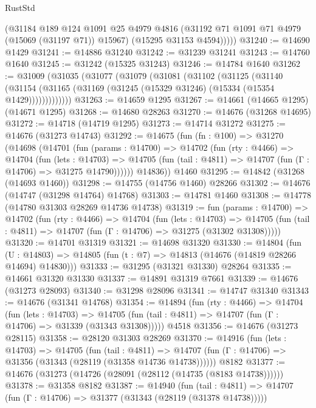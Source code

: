 \begin{lexlean}{RustStd}
\begin{coremodule}
          (@31184
            @189
            @124
            @1091
            @25
            @4979
            @4816
            (@31192 @71 @1091 @71 @4979 (@15069 (@31197 @71)) @15967)
            (@15295 @31153 @4594)))))
@31240 := @14690 @1429
@31241 := @14886 @31240
@31242 := @31239 @31241
@31243 := @14760 @1640
@31245 := @31242 (@15325 @31243)
@31246 := @14784 @1640
@31262 := @31009
    (@31035
      (@31077
        (@31079
          (@31081
            (@31102
              (@31125
                (@31140
                  (@31154 (@31165 (@31169 (@31245 (@15329 @31246) (@15334 (@15354 @1429)))))))))))))
@31263 := @14659 @1295
@31267 := @14661 (@14665 @1295) (@14671 @1295)
@31268 := @14680 @28263
@31270 := @14676 (@31268 @14695)
@31272 := @14718 (@14719 @1295)
@31273 := @14714 @31272
@31275 := @14676 (@31273 @14743)
@31292 := @14675
    (fun (fn : @100) =>
    @31270
      (@14698
        (@14701
          (fun (params : @14700) =>
          @14702
            (fun (rty : @4466) =>
            @14704
              (fun (lets : @14703) =>
              @14705 (fun (tail : @4811) => @14707 (fun (Γ : @14706) => @31275 @14790))))))
        @14836))
    @1460
@31295 := @14842 (@31268 (@14693 @1460))
@31298 := @14755 (@14756 @1460) @28266
@31302 := @14676 (@14747 (@31298 @14764) @14768)
@31303 := @14781 @1460
@31308 := @14778 (@14780 @31303 @28269 @14736 @14738)
@31319 := fun (params : @14700) =>
  @14702
    (fun (rty : @4466) =>
    @14704
      (fun (lets : @14703) =>
      @14705 (fun (tail : @4811) => @14707 (fun (Γ : @14706) => @31275 (@31302 @31308)))))
@31320 := @14701 @31319
@31321 := @14698 @31320
@31330 := @14804
    (fun (U : @14803) => @14805 (fun (t : @7) => @14813 (@14676 (@14819 @28266 @14694) @14830)))
@31333 := @31295 (@31321 @31330) @28264
@31335 := @14661 @31320 @31330
@31337 := @14891 @31319 @7661
@31339 := @14676 (@31273 @28093)
@31340 := @31298 @28096
@31341 := @14747 @31340
@31343 := @14676 (@31341 @14768)
@31354 := @14894
    (fun (rty : @4466) =>
    @14704
      (fun (lets : @14703) =>
      @14705 (fun (tail : @4811) => @14707 (fun (Γ : @14706) => @31339 (@31343 @31308)))))
    @4518
@31356 := @14676 (@31273 @28115)
@31358 := @28120 @31303 @28269
@31370 := @14916
    (fun (lets : @14703) =>
    @14705
      (fun (tail : @4811) =>
      @14707 (fun (Γ : @14706) => @31356 (@31343 (@28119 (@31358 @14736 @14738))))))
    @8182
@31377 := @14676 (@31273 (@14726 (@28091 (@28112 (@14735 (@8183 @14738))))))
@31378 := @31358 @8182
@31387 := @14940
    (fun (tail : @4811) => @14707 (fun (Γ : @14706) => @31377 (@31343 (@28119 (@31378 @14738)))))

\end{coremodule}
\end{lexlean}
